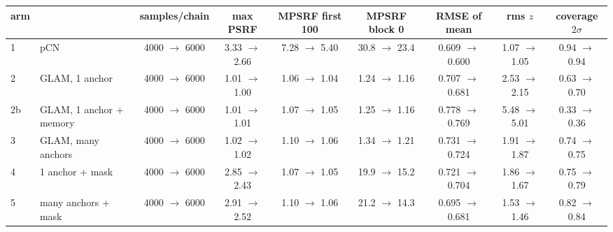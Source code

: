 \begin{tabular}{llccccccc}\toprule
arm & & samples/chain & max PSRF & MPSRF first 100 & MPSRF block 0 & RMSE of mean & rms $z$ & coverage $2\sigma$ \\ \midrule
1 & pCN & 4000 $\to$ 6000 & 3.33 $\to$ 2.66 & 7.28 $\to$ 5.40 & 30.8 $\to$ 23.4 & 0.609 $\to$ 0.600 & 1.07 $\to$ 1.05 & 0.94 $\to$ 0.94 \\
2 & GLAM, 1 anchor & 4000 $\to$ 6000 & 1.01 $\to$ 1.00 & 1.06 $\to$ 1.04 & 1.24 $\to$ 1.16 & 0.707 $\to$ 0.681 & 2.53 $\to$ 2.15 & 0.63 $\to$ 0.70 \\
2b & GLAM, 1 anchor + memory & 4000 $\to$ 6000 & 1.01 $\to$ 1.01 & 1.07 $\to$ 1.05 & 1.25 $\to$ 1.16 & 0.778 $\to$ 0.769 & 5.48 $\to$ 5.01 & 0.33 $\to$ 0.36 \\
3 & GLAM, many anchors & 4000 $\to$ 6000 & 1.02 $\to$ 1.02 & 1.10 $\to$ 1.06 & 1.34 $\to$ 1.21 & 0.731 $\to$ 0.724 & 1.91 $\to$ 1.87 & 0.74 $\to$ 0.75 \\
4 & 1 anchor + mask & 4000 $\to$ 6000 & 2.85 $\to$ 2.43 & 1.07 $\to$ 1.05 & 19.9 $\to$ 15.2 & 0.721 $\to$ 0.704 & 1.86 $\to$ 1.67 & 0.75 $\to$ 0.79 \\
5 & many anchors + mask & 4000 $\to$ 6000 & 2.91 $\to$ 2.52 & 1.10 $\to$ 1.06 & 21.2 $\to$ 14.3 & 0.695 $\to$ 0.681 & 1.53 $\to$ 1.46 & 0.82 $\to$ 0.84 \\
\bottomrule\end{tabular}

